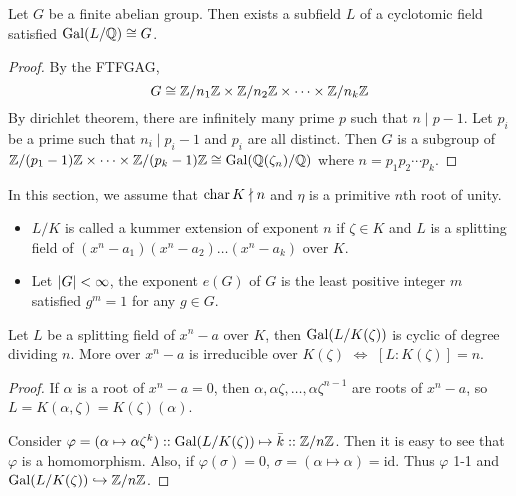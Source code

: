 \begin{theorem}
  Let $G$ be a finite abelian group. Then exists a subfield $L$ of a cyclotomic field satisfied $\operatorname{Gal}(L / \mathbb{Q}) \cong G$.

  \begin{proof}
    By the FTFGAG,
    \[ G \cong \mathbb{Z} / n_1 \mathbb{Z} \times \mathbb{Z} / n_2 \mathbb{Z} \times \dots \times \mathbb{Z} / n_k \mathbb{Z} \]
    By dirichlet theorem, there are infinitely many prime $p$ such that $n \mid p - 1$.
    Let $p_i$ be a prime such that $n_i \mid p_i - 1$ and $p_i$ are all distinct.
    Then $G$ is a subgroup of $\mathbb{Z} / (p_1 - 1) \mathbb{Z} \times \dots \times \mathbb{Z} / (p_k - 1) \mathbb{Z} \cong \operatorname{Gal}(\mathbb{Q}(\zeta_n) / \mathbb{Q})$
    where $n = p_1 p_2 \dotsm p_k$.
  \end{proof}
\end{theorem}

In this section, we assume that $\operatorname{char} K \nmid n$ and $\eta$ is a primitive $n$th root of unity.

\begin{definition} \hfill
  \begin{itemize}
    \item $L/K$ is called a kummer extension of exponent $n$ if $\zeta \in K$ and $L$ is a splitting field
      of $(x^n - a_1) (x^n - a_2) \dots (x^n - a_k)$ over $K$.
    \item Let $\lvert G\rvert < \infty$, the exponent $e(G)$ of $G$ is the least positive integer $m$
      satisfied $g^m = 1$ for any $g \in G$.
  \end{itemize}
\end{definition}

\begin{theorem}
  Let $L$ be a splitting field of $x^n - a$ over $K$, then $\operatorname{Gal}(L / K(\zeta))$ is cyclic of
  degree dividing $n$. More over $x^n - a$ is irreducible over $K(\zeta)$ $\iff$ $[L: K(\zeta)] = n$.

  \begin{proof}
    If $\alpha$ is a root of $x^n - a = 0$, then $\alpha, \alpha \zeta, \dots, \alpha \zeta^{n-1}$
    are roots of $x^n - a$, so $L = K(\alpha, \zeta) = K(\zeta)(\alpha)$.

    Consider $\varphi = (\alpha \mapsto \alpha \zeta^k) :: \operatorname{Gal}(L / K(\zeta)) \mapsto \bar{k} :: \mathbb{Z} / n\mathbb{Z}$.
    Then it is easy to see that $\varphi$ is a homomorphism. Also, if $\varphi(\sigma) = 0$,
    $\sigma = (\alpha \mapsto \alpha) = \mathrm{id}$. Thus $\varphi$ 1-1 and
    $\operatorname{Gal}(L / K(\zeta)) \hookrightarrow \mathbb{Z}/n\mathbb{Z}$.
  \end{proof}
\end{theorem}

